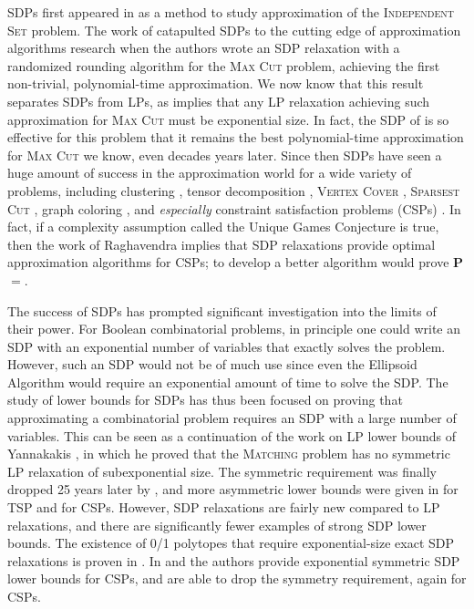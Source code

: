 SDPs first appeared in \cite{Lovasz79} as a method to study approximation of the \textsc{Independent Set} problem. The work of \cite{GW95} catapulted SDPs to the cutting edge of approximation algorithms research when the authors wrote an SDP relaxation with a randomized rounding algorithm for the \textsc{Max Cut} problem, achieving the first non-trivial, polynomial-time approximation. We now know that this result separates SDPs from LPs, as \cite{CLRS16} implies that any LP relaxation achieving such approximation for \textsc{Max Cut} must be exponential size. In fact, the SDP of \cite{GW95} is so effective for this problem that it remains the best polynomial-time approximation for \textsc{Max Cut} we know, even decades years later. Since then SDPs have seen a huge amount of success in the approximation world for a wide variety of problems, including clustering \cite{PW07}, tensor decomposition \cite{TS15}, \textsc{Vertex Cover} \cite{Kar09}, \textsc{Sparsest Cut} \cite{ARV09}, graph coloring \cite{Chlam07}, and \emph{especially} constraint satisfaction problems (CSPs) \cite{FJ97,HZ99,CMM09}. In fact, if a complexity assumption called the Unique Games Conjecture \cite{Khot02} is true, then the work of Raghavendra \cite{Ragh08} implies that SDP relaxations provide optimal approximation algorithms for CSPs; to develop a better algorithm would prove \textbf{P}$ = $\np. 

The success of SDPs has prompted significant investigation into the limits of their power. For Boolean combinatorial problems, in principle one could write an SDP with an exponential number of variables that exactly solves the problem. However, such an SDP would not be of much use since even the Ellipsoid Algorithm would require an exponential amount of time to solve the SDP. The study of lower bounds for SDPs has thus been focused on proving that approximating a combinatorial problem requires an SDP with a large number of variables. This can be seen as a continuation of the work on LP lower bounds of Yannakakis \cite{Yann88}, in which he proved that the \textsc{Matching} problem has no symmetric LP relaxation of subexponential size. The symmetric requirement was finally dropped 25 years later by \cite{Roth14}, and more asymmetric lower bounds were given in \cite{FMPTHW15} for \textsc{TSP} and \cite{CLRS16} for CSPs. 
However, SDP relaxations are fairly new compared to LP relaxations, and there are significantly fewer examples of strong SDP lower bounds. The existence of 0/1 polytopes that require exponential-size exact SDP relaxations is proven in \cite{BDP15}. In \cite{FSP13} and \cite{LRST14} the authors provide exponential symmetric SDP lower bounds for CSPs, and \cite{LRS15} are able to drop the symmetry requirement, again for CSPs. 


